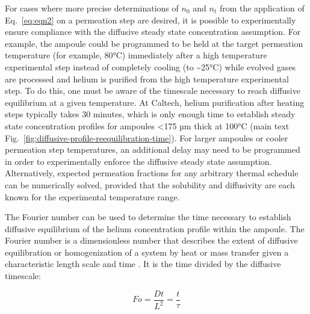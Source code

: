 For cases where more precise determinations of \(n_{0}\) and \(n_{t}\)
from the application of Eq.~\eqref{eq:eqn2} on a permeation step are desired, it is
possible to experimentally ensure compliance with the diffusive steady
state concentration assumption. For example, the ampoule could be
programmed to be held at the target permeation temperature (for example,
80°C) immediately after a high temperature experimental step instead of
completely cooling (to \textasciitilde25°C) while evolved gases are
processed and helium is purified from the high temperature experimental
step. To do this, one must be aware of the timescale necessary to reach
diffusive equilibrium at a given temperature. At Caltech, helium
purification after heating steps typically takes 30 minutes, which is
only enough time to establish steady state concentration profiles for
ampoules \textless175 µm thick at 100°C (main text Fig.~\ref{fig:diffusive-profile-reequilibration-time}). For larger ampoules
or cooler permeation step temperatures, an additional delay may need to
be programmed in order to experimentally enforce the diffusive steady
state assumption. Alternatively, expected permeation fractions for any
arbitrary thermal schedule can be numerically solved, provided that the
solubility and diffusivity are each known for the experimental
temperature range.

The Fourier number can be used to determine the time necessary to
establish diffusive equilibrium of the helium concentration profile
within the ampoule. The Fourier number is a dimensionless number that
describes the extent of diffusive equilibration or homogenization of a
system by heat or mass transfer given a characteristic length scale and
time \citep{ostrogorskyglicksman2015}. It is the time divided by the
diffusive timescale:

\begin{equation}
Fo = \frac{Dt}{L^{2}} = \frac{t}{\tau}
\label{eq:s7-3}
\end{equation}

